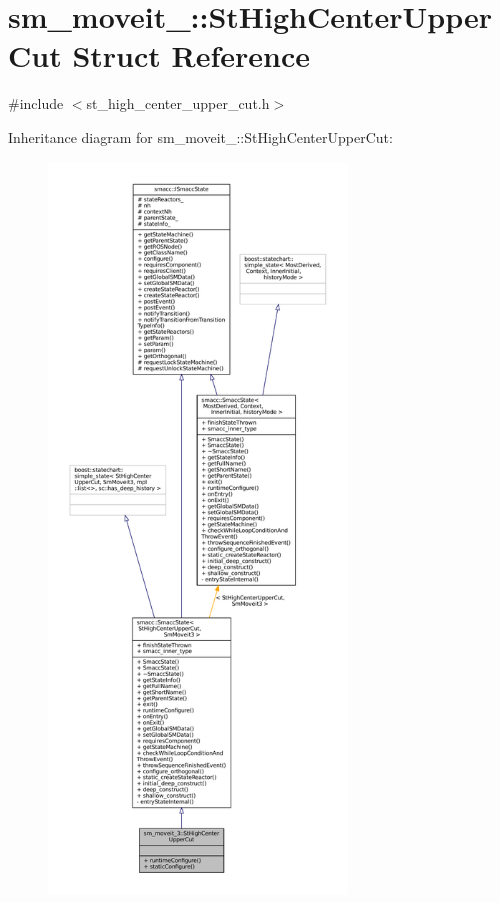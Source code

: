 \hypertarget{structsm__moveit__3_1_1StHighCenterUpperCut}{}\section{sm\+\_\+moveit\+\_\+:\+:St\+High\+Center\+Upper\+Cut Struct Reference}
\label{structsm__moveit__3_1_1StHighCenterUpperCut}


{\ttfamily \#include $<$st\+\_\+high\+\_\+center\+\_\+upper\+\_\+cut.\+h$>$}



Inheritance diagram for sm\+\_\+moveit\+\_\+:\+:St\+High\+Center\+Upper\+Cut\+:
\nopagebreak
\begin{figure}[H]
\begin{center}
\leavevmode
\includegraphics[height=550pt]{structsm__moveit__3_1_1StHighCenterUpperCut__inherit__graph}
\end{center}
\end{figure}


